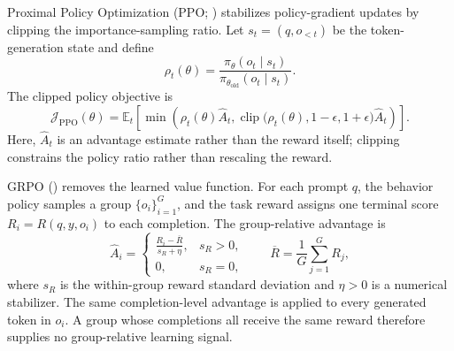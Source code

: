 Proximal Policy Optimization (PPO; \cite{schulman2017proximal}) stabilizes
policy-gradient updates by clipping the importance-sampling ratio. Let
$s_t=(q,o_{<t})$ be the token-generation state and define
\begin{equation*}
    \rho_t(\theta)
    =
    \frac{\pi_\theta(o_t\mid s_t)}
         {\pi_{\theta_{\mathrm{old}}}(o_t\mid s_t)}.
\end{equation*}
The clipped policy objective is
\begin{equation}
    \mathcal{J}_{\mathrm{PPO}}(\theta)
    =
    \mathbb{E}_t\!\left[
        \min\!\left(
            \rho_t(\theta)\widehat{A}_t,
            \operatorname{clip}
            \bigl(\rho_t(\theta),1-\epsilon,1+\epsilon\bigr)
            \widehat{A}_t
        \right)
    \right].
\end{equation}
Here, $\widehat{A}_t$ is an advantage estimate rather than the reward itself;
clipping constrains the policy ratio rather than rescaling the reward.




GRPO (\cite{shao2024deepseekmath}) removes the learned value function. For
each prompt $q$, the behavior policy samples a group
$\{o_i\}_{i=1}^{G}$, and the task reward assigns one terminal score
$R_i=R(q,y,o_i)$ to each completion. The group-relative advantage is
\begin{equation}
    \widehat{A}_i
    =
    \begin{cases}
    \displaystyle\frac{R_i-\overline{R}}{s_R+\eta}, & s_R>0,\\[7pt]
    0, & s_R=0,
    \end{cases}
    \qquad
    \overline{R}=\frac{1}{G}\sum_{j=1}^{G}R_j,
\end{equation}
where $s_R$ is the within-group reward standard deviation and $\eta>0$ is a
numerical stabilizer. The same completion-level advantage is applied to every
generated token in $o_i$. A group whose completions all receive the same
reward therefore supplies no group-relative learning signal.





